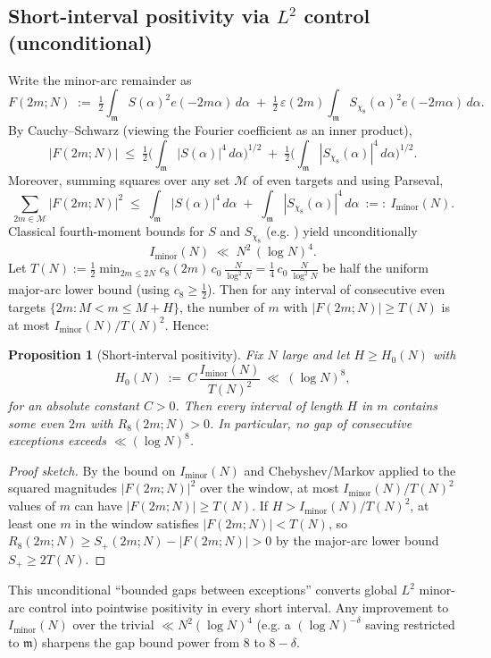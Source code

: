 \documentclass[11pt]{article}
\newtheorem{proposition}[theorem]{Proposition}
\theoremstyle{definition}
\theoremstyle{remark}
\begin{document}
\subsection*{Short-interval positivity via $L^2$ control (unconditional)}
Write the minor-arc remainder as
\[
F(2m;N)\;:=\;\tfrac12\int_{\mathfrak m} S(\alpha)^2 e(-2m\alpha)\,d\alpha\;{+}\;\tfrac12\,\varepsilon(2m)\int_{\mathfrak m} S_{\chi_8}(\alpha)^2 e(-2m\alpha)\,d\alpha.
\]
By Cauchy–Schwarz (viewing the Fourier coefficient as an inner product),
\[
|F(2m;N)|\;\le\;\tfrac12\Big(\int_{\mathfrak m}|S(\alpha)|^4\,d\alpha\Big)^{\!1/2}\;{+}\;\tfrac12\Big(\int_{\mathfrak m}|S_{\chi_8}(\alpha)|^4\,d\alpha\Big)^{\!1/2}.
\]
Moreover, summing squares over any set $\mathcal M$ of even targets and using Parseval,
\[
\sum_{2m\in\mathcal M}\! |F(2m;N)|^2\;\le\; \int_{\mathfrak m}|S(\alpha)|^4\,d\alpha\;{+}\;\int_{\mathfrak m}|S_{\chi_8}(\alpha)|^4\,d\alpha\ :=:\ I_{\mathrm{minor}}(N).
\]
Classical fourth-moment bounds for $S$ and $S_{\chi_8}$ (e.g. \cite[Ch.~13]{MontgomeryVaughan2007}) yield unconditionally
\[
I_{\mathrm{minor}}(N)\;\ll\; N^2\,(\log N)^4.
\]
Let $T(N):=\tfrac12\min_{2m\le 2N} c_8(2m)\,c_0\,\frac{N}{\log^2 N}=\tfrac14\,c_0\,\frac{N}{\log^2 N}$ be half the uniform major-arc lower bound (using $c_8\ge \tfrac12$). Then for any interval of consecutive even targets $\{2m: M< m\le M+H\}$, the number of $m$ with $|F(2m;N)|\ge T(N)$ is at most $I_{\mathrm{minor}}(N)/T(N)^2$. Hence:

\begin{proposition}[Short-interval positivity]
Fix $N$ large and let $H\ge H_0(N)$ with
\[
H_0(N)\ :=\ C\,\frac{I_{\mathrm{minor}}(N)}{T(N)^2}\ \ll\ (\log N)^8,
\]
for an absolute constant $C>0$. Then every interval of length $H$ in $m$ contains some even $2m$ with $R_8(2m;N)>0$. In particular, no gap of consecutive exceptions exceeds $\ll (\log N)^8$.
\end{proposition}

\begin{proof}[Proof sketch]
By the bound on $I_{\mathrm{minor}}(N)$ and Chebyshev/Markov applied to the squared magnitudes $|F(2m;N)|^2$ over the window, at most $I_{\mathrm{minor}}(N)/T(N)^2$ values of $m$ can have $|F(2m;N)|\ge T(N)$. If $H> I_{\mathrm{minor}}(N)/T(N)^2$, at least one $m$ in the window satisfies $|F(2m;N)|<T(N)$, so $R_8(2m;N)\ge S_+(2m;N)-|F(2m;N)|>0$ by the major-arc lower bound $S_+\ge 2T(N)$.
\end{proof}

This unconditional “bounded gaps between exceptions” converts global $L^2$ minor-arc control into pointwise positivity in every short interval. Any improvement to $I_{\mathrm{minor}}(N)$ over the trivial $\ll N^2(\log N)^4$ (e.g. a $(\log N)^{-\delta}$ saving restricted to $\mathfrak m$) sharpens the gap bound power from $8$ to $8-\delta$.
\end{document}
